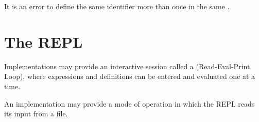 It is an error to define the same identifier more than once in the
same .

\section{The REPL}

Implementations may provide an interactive session called a
 (Read-Eval-Print Loop), where
expressions and definitions can be
entered and evaluated one at a time.

An implementation may provide a mode of operation in which the REPL
reads its input from a file.

